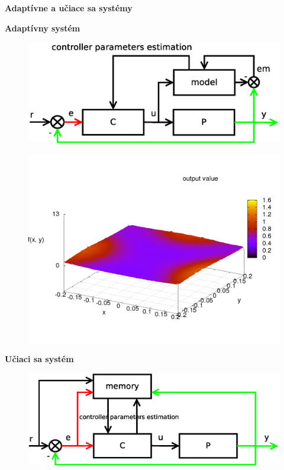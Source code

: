 \documentclass[xcolor=dvipsnames]{beamer}
\begin{document}
\begin{frame}{\bf Adaptívne a učiace sa systémy}

\begin{minipage}{.5\textwidth}
  {\bf Adaptívny systém}

  \begin{figure}[!htb]
  \centering
  \includegraphics[scale=.22]{../diagrams/adaptive_system.eps}
  \label{fig:adaptive_system}
  \end{figure}

  \begin{figure}[!htb]
  \centering
  \includegraphics[scale=.2]{../pictures/function_f1.png}
  \end{figure}

\end{minipage}%
\begin{minipage}{.5\textwidth}

  {\bf Učiaci sa systém}

  \begin{figure}[!htb]
  \centering
  \includegraphics[scale=.22]{../diagrams/learning_system.eps}
  \label{fig:learning_system}
  \end{figure}


\end{minipage}
\end{frame}
\end{document}
